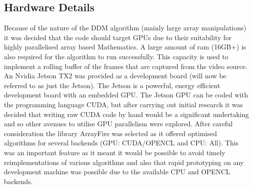 \documentclass[11pt]{article}
\begin{document}
\subsection{Hardware Details}
Because of the nature of the DDM algorithm (mainly large array manipulations) it was decided that the code should target GPUs due to their suitability for highly parallelised array based Mathematics. A large amount of ram (16GB+) is also required for the algorithm to run successfully. This capacity is used to implement a rolling buffer of the frames that are captured from the video source. An Nvidia Jetson TX2 was provided as a development board (will now be referred to as just the Jetson). The Jetson is a powerful, energy efficient development board with an embedded GPU\cite{jetson}. The Jetson GPU can be coded with the programming language CUDA, but after carrying out initial research \cite{cuda_book} it was decided that writing raw CUDA code by hand would be a significant undertaking and so other avenues to utilise GPU parallelism were explored. After careful consideration the library ArrayFire was selected as it offered optimised algorithms for several backends (GPU: CUDA/OPENCL and CPU: All)\cite{arrayfire}. This was an important feature as it meant it would be possible to avoid timely reimplementations of various algorithms and also that rapid prototyping on any development machine was possible due to the available CPU and OPENCL backends.
\end{document}
